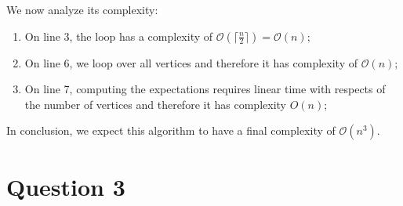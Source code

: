 \documentclass[11pt,a4paper]{article}
\newcommand{\ceil}[1]{\lceil #1 \rceil}
\begin{document}
We now analyze its complexity:
\begin{enumerate}
\item On line 3, the loop has a complexity of $\mathcal{O}(\ceil{\frac{n}{2}}) = \mathcal{O}(n)$;
\item On line 6, we loop over all vertices and therefore it has complexity of $\mathcal{O}(n)$;
\item On line 7, computing the expectations requires linear time with respects of the number of vertices and
therefore it has complexity $O(n)$;
\end{enumerate}
In conclusion, we expect this algorithm to have a final complexity of $\mathcal{O}(n^3)$.

\section*{Question 3}
\end{document}
